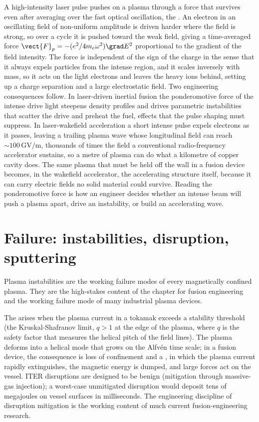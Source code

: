 \begin{mastery}
A high-intensity laser pulse pushes on a plasma through a force that survives
even after averaging over the fast optical oscillation, the . An electron in an oscillating field of non-uniform amplitude is driven
harder where the field is strong, so over a cycle it is pushed toward the weak
field, giving a time-averaged force $\vect{F}_p = -(e^{2}/4m_e\omega^{2})\grad
E^{2}$ proportional to the gradient of the field intensity. The force is
independent of the sign of the charge in the sense that it always expels
particles from the intense region, and it scales inversely with mass, so it acts
on the light electrons and leaves the heavy ions behind, setting up a charge
separation and a large electrostatic field. Two engineering consequences follow.
In laser-driven inertial fusion the ponderomotive force of the intense drive
light steepens density profiles and drives parametric instabilities that scatter
the drive and preheat the fuel, effects that the pulse shaping must suppress. In
laser-wakefield acceleration a short intense pulse expels electrons as it passes,
leaving a trailing plasma wave whose longitudinal field can reach $\sim
100\,\si{\giga\volt\per\meter}$, thousands of times the field a conventional
radio-frequency accelerator sustains, so a metre of plasma can do what a
kilometre of copper cavity does. The same plasma that must be held off the wall
in a fusion device becomes, in the wakefield accelerator, the accelerating
structure itself, because it can carry electric fields no solid material could
survive. Reading the ponderomotive force is how an engineer decides whether an
intense beam will push a plasma apart, drive an instability, or build an
accelerating wave.
\end{mastery}

\section{Failure: instabilities, disruption, sputtering}

Plasma instabilities are the working failure modes of every
magnetically confined plasma. They are the high-stakes content of
the chapter for fusion engineering and the working failure mode of
many industrial plasma devices.

The  arises when the plasma current in a
tokamak exceeds a stability threshold (the Kruskal-Shafranov limit,
$q > 1$ at the edge of the plasma, where $q$ is the safety factor
that measures the helical pitch of the field lines). The plasma
deforms into a helical mode that grows on the Alfv\'en time scale;
in a fusion device, the consequence is loss of confinement and a
, in which the plasma current rapidly extinguishes,
the magnetic energy is dumped, and large forces act on the vessel.
ITER disruptions are designed to be benign (mitigation through
massive-gas injection); a worst-case unmitigated disruption would
deposit tens of megajoules on vessel surfaces in milliseconds. The
engineering discipline of disruption mitigation is the working
content of much current fusion-engineering research.

